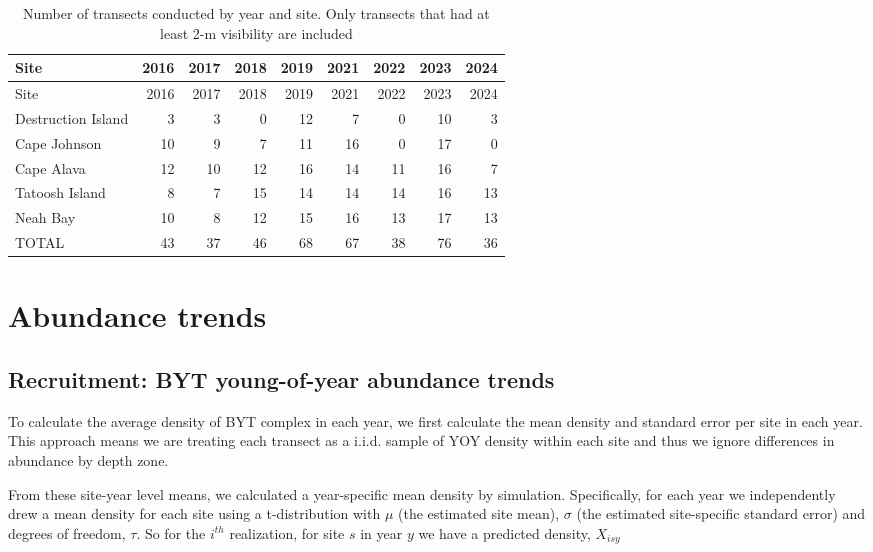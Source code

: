 \documentclass[
  letterpaper,
  DIV=11,
  numbers=noendperiod]{scrartcl}
\begin{document}
\hypertarget{tbl-samples-YS}{}
\begin{longtable}[]{@{}lrrrrrrrr@{}}
\caption{\label{tbl-samples-YS}Number of transects conducted by year and
site. Only transects that had at least 2-m visibility are
included}\tabularnewline
\toprule\noalign{}
Site & 2016 & 2017 & 2018 & 2019 & 2021 & 2022 & 2023 & 2024 \\
\midrule\noalign{}
\endfirsthead
\toprule\noalign{}
Site & 2016 & 2017 & 2018 & 2019 & 2021 & 2022 & 2023 & 2024 \\
\midrule\noalign{}
\endhead
\bottomrule\noalign{}
\endlastfoot
Destruction Island & 3 & 3 & 0 & 12 & 7 & 0 & 10 & 3 \\
Cape Johnson & 10 & 9 & 7 & 11 & 16 & 0 & 17 & 0 \\
Cape Alava & 12 & 10 & 12 & 16 & 14 & 11 & 16 & 7 \\
Tatoosh Island & 8 & 7 & 15 & 14 & 14 & 14 & 16 & 13 \\
Neah Bay & 10 & 8 & 12 & 15 & 16 & 13 & 17 & 13 \\
TOTAL & 43 & 37 & 46 & 68 & 67 & 38 & 76 & 36 \\
\end{longtable}

\hypertarget{abundance-trends}{%
\section{Abundance trends}\label{abundance-trends}}

\hypertarget{recruitment-byt-young-of-year-abundance-trends}{%
\subsection{Recruitment: BYT young-of-year abundance
trends}\label{recruitment-byt-young-of-year-abundance-trends}}

To calculate the average density of BYT complex in each year, we first
calculate the mean density and standard error per site in each year.
This approach means we are treating each transect as a i.i.d. sample of
YOY density within each site and thus we ignore differences in abundance
by depth zone.

From these site-year level means, we calculated a year-specific mean
density by simulation. Specifically, for each year we independently drew
a mean density for each site using a t-distribution with \(\mu\) (the
estimated site mean), \(\sigma\) (the estimated site-specific standard
error) and degrees of freedom, \(\tau\). So for the \(i^{th}\)
realization, for site \(s\) in year \(y\) we have a predicted density,
\(X_{isy}\)
\end{document}
